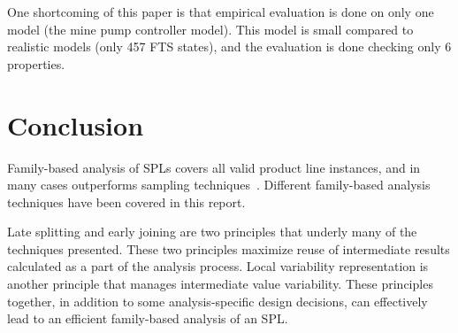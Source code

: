 \documentclass[11pt]{article}
\begin{document}
One shortcoming of this paper is that empirical evaluation is done on only one model (the mine pump controller model). This model is small compared to realistic models (only 457 FTS states), and the evaluation is done checking only 6 properties.

\section{Conclusion}

Family-based analysis of SPLs covers all valid product line instances, and in many cases outperforms sampling techniques~\cite{Apel:2013, Liebig:2013}. Different family-based analysis techniques have been covered in this report. 

Late splitting and early joining are two principles that underly many of the techniques presented. These two principles maximize reuse of intermediate results calculated as a part of the analysis process. Local variability representation is another principle that manages intermediate value variability. These principles together, in addition to some analysis-specific design decisions, can effectively lead to an efficient family-based analysis of an SPL.

 
\end{document}
